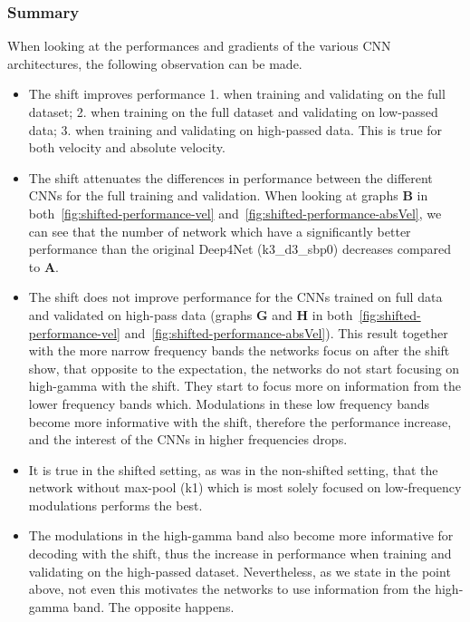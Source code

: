 \subsubsection{Summary}\label{subsubsec:centre-shiftig-summary}
When looking at the performances and gradients of the various CNN architectures, the following observation can be made.
\begin{itemize}
    \item The shift improves performance 1. when training and validating on the full dataset; 2. when training on the full dataset and validating on low-passed data;
    3. when training and validating on high-passed data. This is true for both velocity and absolute velocity.
    \item The shift attenuates the differences in performance between the different CNNs for the full training and validation.
    When looking at graphs \textbf{B} in both~\cref{fig:shifted-performance-vel} and~\cref{fig:shifted-performance-absVel}, we can see that the number of network which have a significantly better performance than the original Deep4Net (k3\_d3\_sbp0) decreases compared to \textbf{A}.
    \item The shift does not improve performance for the CNNs trained on full data and validated on high-pass data (graphs \textbf{G} and \textbf{H} in both~\ref{fig:shifted-performance-vel} and~\ref{fig:shifted-performance-absVel}).
    This result together with the more narrow frequency bands the networks focus on after the shift show, that opposite to the expectation, the networks do not start focusing on high-gamma with the shift.
    They start to focus more on information from the lower frequency bands which.
    Modulations in these low frequency bands become more informative with the shift, therefore the performance increase, and the interest of the CNNs in higher frequencies drops.
    \item It is true in the shifted setting, as was in the non-shifted setting, that the network without max-pool (k1) which is most solely focused on low-frequency modulations performs the best.
    \item The modulations in the high-gamma band also become more informative for decoding with the shift, thus the increase in performance when training and validating on the high-passed dataset.
    Nevertheless, as we state in the point above, not even this motivates the networks to use information from the high-gamma band.
    The opposite happens.
\end{itemize}

